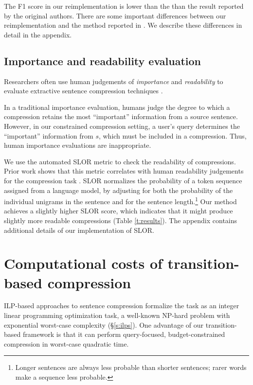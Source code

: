 \documentclass[11pt,a4paper]{article}
\begin{document}
The F1 score in our reimplementation is lower than the than the result reported by the original authors. There are some important differences between our reimplementation and the method reported in \citet{filippova2013overcoming}. We describe these differences in detail in the appendix.

\subsection{Importance and readability evaluation}\label{s:readabilityinformativeness}

Researchers often use human judgements of \textit{importance} and \textit{readability} to evaluate extractive sentence compression techniques \cite{Knight2000StatisticsBasedS,clarke2008global,filippova2015sentence}. 

In a traditional importance evaluation, humans judge the degree to which a compression retains the most ``important'' information from a source sentence. However, in our constrained compression setting, a user's query determines the ``important'' information from $s$, which must be included in a compression. Thus, human importance evaluations are inappropriate.
 
We use the automated SLOR metric \cite{lau2015unsupervised} to check the readability of compressions. Prior work shows that this metric correlates with human readability judgements for the compression task \cite{kannConl}. SLOR normalizes the probability of a token sequence assigned from a language model, by adjusting for both the probability of the individual unigrams in the sentence and for the sentence length.\footnote{Longer sentences are always less probable than shorter sentences; rarer words make a sequence less probable.} Our method achieves a slightly higher SLOR score, which indicates that it might produce slightly more readable compressions (Table \ref{t:results}). The appendix contains additional details of our implementation of SLOR. 

\section{Computational costs of transition-based compression}\label{s:costs}

ILP-based approaches to sentence compression formalize the task as an integer linear programming optimization task, a well-known NP-hard problem with exponential worst-case complexity (\S\ref{s:ilps}). One advantage of our transition-based framework is that it can perform query-focused, budget-constrained compression in worst-case quadratic time. 
\end{document}
